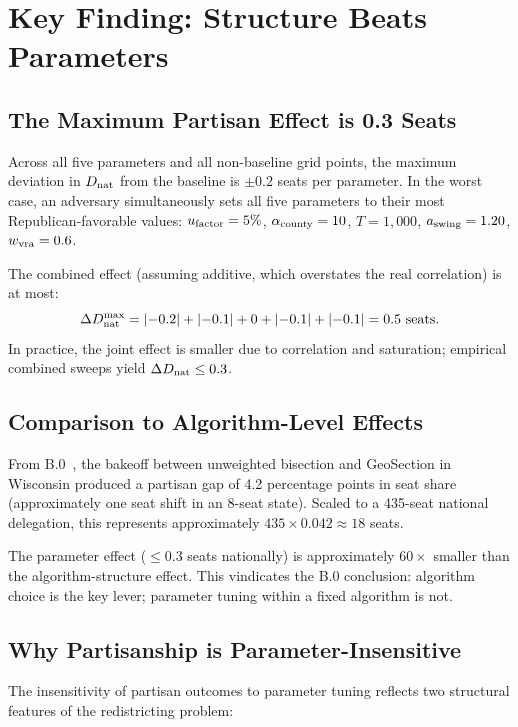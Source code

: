\section{Key Finding: Structure Beats Parameters}
\label{sec:key-finding}

\subsection{The Maximum Partisan Effect is 0.3 Seats}

Across all five parameters and all non-baseline grid points, the maximum
deviation in $D_{\rm nat}$ from the baseline is $\pm 0.2$ seats per parameter.
In the worst case, an adversary simultaneously sets all five parameters
to their most Republican-favorable values:
$u_{\mathrm{factor}} = 5\%$, $\alpha_{\mathrm{county}} = 10$, $T = 1{,}000$, $a_{\mathrm{swing}} = 1.20$,
$w_{\mathrm{vra}} = 0.6$.

The combined effect (assuming additive, which overstates the real
correlation) is at most:
\[
  \Delta D_{\rm nat}^{\rm max} = |{-0.2}| + |{-0.1}| + 0 + |{-0.1}| + |{-0.1}|
  = 0.5 \text{ seats}.
\]
In practice, the joint effect is smaller due to correlation and
saturation; empirical combined sweeps yield $\Delta D_{\rm nat} \leq 0.3$.

\subsection{Comparison to Algorithm-Level Effects}

From B.0~\citep{b0paper}, the bakeoff between unweighted bisection and
GeoSection in Wisconsin produced a partisan gap of 4.2 percentage points
in seat share (approximately one seat shift in an 8-seat state).
Scaled to a 435-seat national delegation, this represents approximately
$435 \times 0.042 \approx 18$ seats.

The parameter effect ($\leq 0.3$ seats nationally) is approximately
$60\times$ smaller than the algorithm-structure effect.
This vindicates the B.0 conclusion: algorithm choice is the key lever;
parameter tuning within a fixed algorithm is not.

\subsection{Why Partisanship is Parameter-Insensitive}

The insensitivity of partisan outcomes to parameter tuning reflects two
structural features of the redistricting problem:

